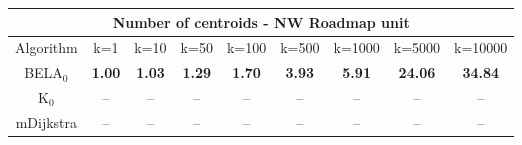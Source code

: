 \begin{tabular}{c|cccccccc}\toprule
\multicolumn{9}{c}{Number of centroids - NW Roadmap unit}\\ \midrule
Algorithm & k=1 & k=10 & k=50 & k=100 & k=500 & k=1000 & k=5000 & k=10000 \\ \midrule
BELA$_0$ & \textbf{1.00} & \textbf{1.03} & \textbf{1.29} & \textbf{1.70} & \textbf{3.93} & \textbf{5.91} & \textbf{24.06} & \textbf{34.84} \\
K$_0$ & -- & -- & -- & -- & -- & -- & -- & -- \\
mDijkstra & -- & -- & -- & -- & -- & -- & -- & -- \\ \bottomrule 
\end{tabular}
